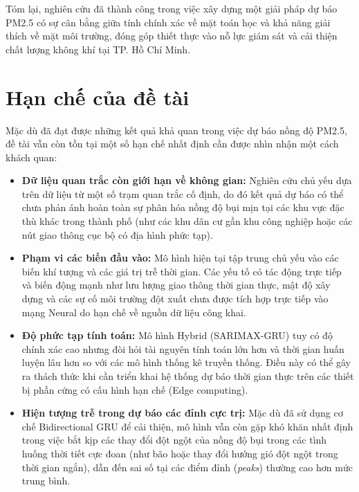 Tóm lại, nghiên cứu đã thành công trong việc xây dựng một giải pháp dự báo PM2.5 có sự cân bằng giữa tính chính xác về mặt toán học và khả năng giải thích về mặt môi trường, đóng góp thiết thực vào nỗ lực giám sát và cải thiện chất lượng không khí tại TP. Hồ Chí Minh.

\section{Hạn chế của đề tài}

Mặc dù đã đạt được những kết quả khả quan trong việc dự báo nồng độ PM2.5, đề tài vẫn còn tồn tại một số hạn chế nhất định cần được nhìn nhận một cách khách quan:

\begin{itemize}
    \item \textbf{Dữ liệu quan trắc còn giới hạn về không gian:} Nghiên cứu chủ yếu dựa trên dữ liệu từ một số trạm quan trắc cố định, do đó kết quả dự báo có thể chưa phản ánh hoàn toàn sự phân hóa nồng độ bụi mịn tại các khu vực đặc thù khác trong thành phố (như các khu dân cư gần khu công nghiệp hoặc các nút giao thông cục bộ có địa hình phức tạp).
    
    \item \textbf{Phạm vi các biến đầu vào:} Mô hình hiện tại tập trung chủ yếu vào các biến khí tượng và các giá trị trễ thời gian. Các yếu tố có tác động trực tiếp và biến động mạnh như lưu lượng giao thông thời gian thực, mật độ xây dựng và các sự cố môi trường đột xuất chưa được tích hợp trực tiếp vào mạng Neural do hạn chế về nguồn dữ liệu công khai.
    
    \item \textbf{Độ phức tạp tính toán:} Mô hình Hybrid (SARIMAX-GRU) tuy có độ chính xác cao nhưng đòi hỏi tài nguyên tính toán lớn hơn và thời gian huấn luyện lâu hơn so với các mô hình thống kê truyền thống. Điều này có thể gây ra thách thức khi cần triển khai hệ thống dự báo thời gian thực trên các thiết bị phần cứng có cấu hình hạn chế (Edge computing).
    
    \item \textbf{Hiện tượng trễ trong dự báo các đỉnh cực trị:} Mặc dù đã sử dụng cơ chế Bidirectional GRU để cải thiện, mô hình vẫn còn gặp khó khăn nhất định trong việc bắt kịp các thay đổi đột ngột của nồng độ bụi trong các tình huống thời tiết cực đoan (như bão hoặc thay đổi hướng gió đột ngột trong thời gian ngắn), dẫn đến sai số tại các điểm đỉnh (\textit{peaks}) thường cao hơn mức trung bình.
\end{itemize}

